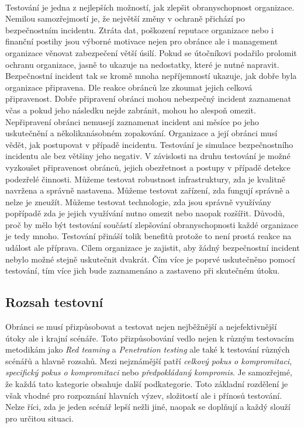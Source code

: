 \paragraph{}
Testování je jedna z nejlepších možností, jak zlepšit obranyschopnost organizace.
Nemilou samozřejmostí je, že největší změny v ochraně přichází po bezpečnostním incidentu.
Ztráta dat, poškození reputace organizace nebo i finanční postihy jsou výborné motivace nejen pro obránce ale i management organizace věnovat zabezpečení větší úsilí.
Pokud se útočníkovi podařilo prolomit ochranu organizace, jasně to ukazuje na nedostatky, které je nutné napravit.
Bezpečnostní incident tak se kromě mnoha nepříjemností ukazuje, jak dobře byla organizace připravena.
Dle reakce obránců lze zkoumat jejich celková připravenost.
Dobře připravení obránci mohou nebezpečný incident zaznamenat včas a pokud jeho následku nejde zabránit, mohou ho alespoň omezit.
Nepřipravení obránci nemusejí zaznamenat incident ani měsíce po jeho uskutečnění a několikanásobném zopakování.
Organizace a její obránci musí vědět, jak postupovat v případě incidentu.
Testování je simulace bezpečnostního incidentu ale bez většiny jeho negativ.
V závislosti na druhu testování je možné vyzkoušet připravenost obránců, jejich obezřetnost a postupy v případě detekce podezřelé činnosti.
Můžeme testovat robustnost infrastruktury, zda je kvalitně navržena a správně nastavena.
Můžeme testovat zařízení, zda fungují správně a nelze je zneužít.
Můžeme testovat technologie, zda jsou správně využívány popřípadě zda je jejich využívání nutno omezit nebo naopak rozšířit.
Důvodů, proč by mělo být testování součástí zlepšování obranyschopnosti každé organizace je tedy mnoho.
Testování přináší tolik benefitů protože to není prostá reakce na událost ale příprava.
Cílem organizace je zajistit, aby žádný bezpečnostní incident nebylo možné stejně uskutečnit dvakrát.
Čím více je poprvé uskutečněno pomocí testování, tím více jich bude zaznamenáno a zastaveno při skutečném útoku.


\subsection{Rozsah testovní}
Obránci se musí přizpůsobovat a testovat nejen nejběžnější a nejefektivnější útoky ale i krajní scénáře.
Toto přizpůsobování vedlo nejen k různým testovacím metodikám jako \textit{Red teaming} a \textit{Penetration testing} ale také k testování různých scénářů a hlavně rozsahů.
Mezi nejznámější patří \textit{celkový pokus o kompromitaci}, \textit{specifický pokus o kompromitaci} nebo \textit{předpokládaný kompromis}.
Je samozřejmé, že každá tato kategorie obsahuje další podkategorie.
Toto základní rozdělení je však vhodné pro rozpoznání hlavních výzev, složitostí ale i přínosů testování.
Nelze říci, zda je jeden scénář lepší nežli jiné, naopak se doplňují a každý slouží pro určitou situaci.\cite{red_team_oakley_2019}

